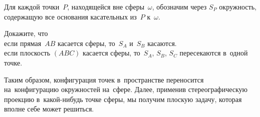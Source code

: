 






Для каждой точки~$P$, находящейся вне сферы~$\omega$, обозначим через $S_P$
окружность, содержащую все основания касательных из~$P$ к~$\omega$.

\begin{problems}

\item
Докажите, что
\\
\subproblem
если прямая~$AB$ касается сферы, то~$S_A$ и~$S_B$ касаются.
\\
\subproblem
если плоскость $(ABC)$ касается сферы, то~$S_{A}$, $S_{B}$, $S_{C}$
пересекаются в~одной точке.

\end{problems}

Таким образом, конфигурация точек в~пространстве переносится на~конфигурацию
окружностей на~сфере.
Далее, применив стереографическую проекцию в~какой-нибудь точке сферы, мы
получим плоскую задачу, которая вполне себе может решиться.

